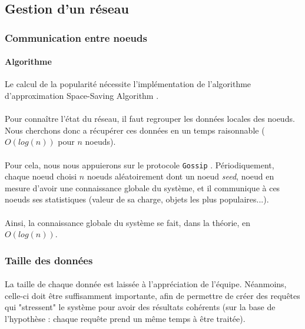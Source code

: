 \documentclass[12pt]{article}
\begin{document}
\subsection{Gestion d'un réseau}

\subsubsection{Communication entre noeuds}


\paragraph{Algorithme} Le calcul de la popularité nécessite l'implémentation de l'algorithme d'approximation Space-Saving Algorithm \cite{SpaceSaving}.

\paragraph{}Pour connaître l'état du réseau, il faut regrouper les données locales des noeuds.
Nous cherchons donc a récupérer ces données en un temps raisonnable ($O(log(n))$ pour $n$ noeuds).

\paragraph{}Pour cela, nous nous appuierons sur le protocole \texttt{Gossip} \cite{gossip}.
Périodiquement, chaque noeud choisi $n$ noeuds aléatoirement dont un noeud \textit{seed}, noeud en mesure d'avoir une connaissance globale du système, et il communique à ces noeuds ses statistiques (valeur de sa charge, objets les plus populaires...).

\paragraph{}Ainsi, la connaissance globale du système se fait, dans la théorie, en $O(log(n))$.


\subsubsection{Taille des données}

\paragraph{} La taille de chaque donnée est laissée à l'appréciation de l'équipe. 
Néanmoins, celle-ci doit être suffisamment importante, afin de permettre de créer des requêtes qui "stressent" le système pour avoir des résultats cohérents (sur la base de l'hypothèse : chaque requête prend un même temps à être traitée).
\end{document}
